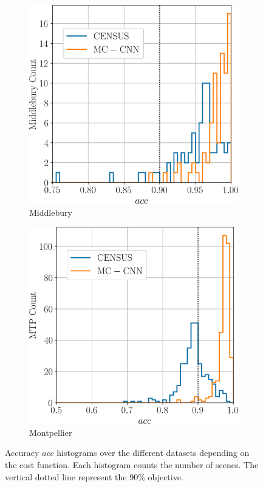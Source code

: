 \begin{figure}
    \centering
    \begin{subfigure}[t]{0.5\linewidth}
        \centering
        \includegraphics[width=\linewidth]{Images/Chap_5/histogram_acc_middlebury.png}
        \caption{Middlebury}
        \label{fig:acc_middlebury}
    \end{subfigure}\hfill
    \begin{subfigure}[t]{0.5\linewidth}
        \centering
        \includegraphics[width=\linewidth]{Images/Chap_5/histogram_acc_mtp.png}
        \caption{Montpellier}
        \label{fig:acc_mtp}
    \end{subfigure}
    \caption{Accuracy $acc$ histograms over the different datasets depending on the cost function. Each histogram counts the number of scenes. The vertical dotted line represent the $90\%$ objective.}
    \label{fig:acc_hist}
\end{figure}

